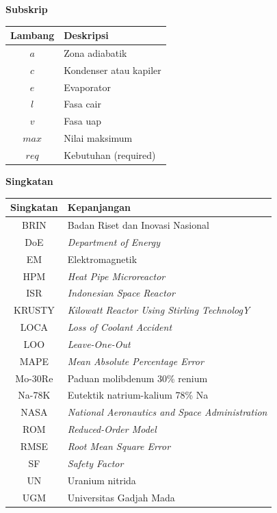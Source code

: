 \documentclass[
  indonesian,
  12pt,
  a4paper,
]{report}
\newcounter{none} %
\begin{document}
\textbf{Subskrip}

{\def\LTcaptype{none} %
\begin{longtable}[]{@{}cl@{}}
\toprule\noalign{}
Lambang & Deskripsi \\
\midrule\noalign{}
\endhead
\bottomrule\noalign{}
\endlastfoot
\(a\) & Zona adiabatik \\
\(c\) & Kondenser atau kapiler \\
\(e\) & Evaporator \\
\(l\) & Fasa cair \\
\(v\) & Fasa uap \\
\(max\) & Nilai maksimum \\
\(req\) & Kebutuhan (required) \\
\end{longtable}
}

\textbf{Singkatan}

{\def\LTcaptype{none} %
\begin{longtable}[]{@{}cl@{}}
\toprule\noalign{}
Singkatan & Kepanjangan \\
\midrule\noalign{}
\endhead
\bottomrule\noalign{}
\endlastfoot
BRIN & Badan Riset dan Inovasi Nasional \\
DoE & \emph{Department of Energy} \\
EM & Elektromagnetik \\
HPM & \emph{Heat Pipe Microreactor} \\
ISR & \emph{Indonesian Space Reactor} \\
KRUSTY & \emph{Kilowatt Reactor Using Stirling TechnologY} \\
LOCA & \emph{Loss of Coolant Accident} \\
LOO & \emph{Leave-One-Out} \\
MAPE & \emph{Mean Absolute Percentage Error} \\
Mo-30Re & Paduan molibdenum 30\% renium \\
Na-78K & Eutektik natrium-kalium 78\% Na \\
NASA & \emph{National Aeronautics and Space Administration} \\
ROM & \emph{Reduced-Order Model} \\
RMSE & \emph{Root Mean Square Error} \\
SF & \emph{Safety Factor} \\
UN & Uranium nitrida \\
UGM & Universitas Gadjah Mada \\
\end{longtable}
}
\end{document}
